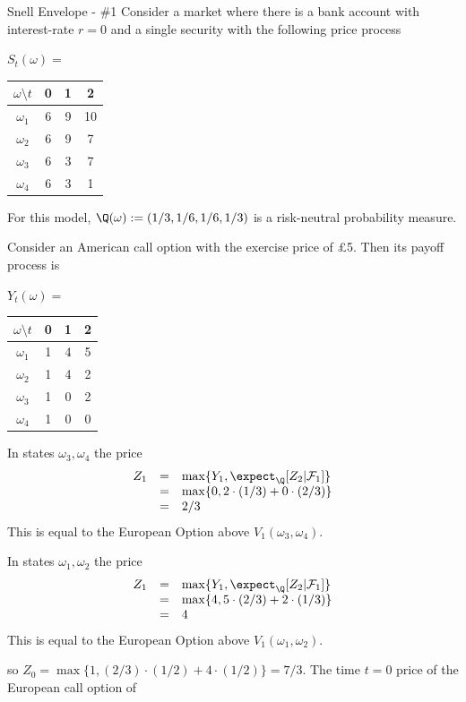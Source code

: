 \documentclass[11pt,a4paper]{article}
\begin{document}
  \begin{example}{Snell Envelope - \#1}\label{ex_snell_evelope_1}
    Consider a market where there is a bank account with interest-rate $r=0$ and a single security with the following price process
    \begin{center}
      $S_t(\omega)=$\begin{tabular}{c|ccc}
        $\omega\setminus t$&0&1&2\\\hline
        $\omega_1$&6&9&10\\
        $\omega_2$&6&9&7\\
        $\omega_3$&6&3&7\\
        $\omega_4$&6&3&1
      \end{tabular}
    \end{center}
    For this model, $\Q(\omega):=(1/3,1/6,1/6,1/3)$ is a risk-neutral probability measure.
    \par Consider an American call option with the exercise price of £5. Then its payoff process is
    \begin{center}
      $Y_t(\omega)=$\begin{tabular}{c|ccc}
        $\omega\setminus t$&0&1&2\\\hline
        $\omega_1$&1&4&5\\
        $\omega_2$&1&4&2\\
        $\omega_3$&1&0&2\\
        $\omega_4$&1&0&0
      \end{tabular}
    \end{center}
    In states $\omega_3,\omega_4$ the price
    \[\begin{array}{rcl}
      Z_1&=&\max\{Y_1,\expect_\Q[Z_2|\mathcal{F}_1]\}\\
      &=&\max\{0,2\cdot(1/3)+0\cdot(2/3)\}\\
      &=&2/3
    \end{array}\]
    This is equal to the European Option above $V_1(\omega_3,\omega_4)$.
    \par In states $\omega_1,\omega_2$ the price
    \[\begin{array}{rcl}
      Z_1&=&\max\{Y_1,\expect_\Q[Z_2|\mathcal{F}_1]\}\\
      &=&\max\{4,5\cdot(2/3)+2\cdot(1/3)\}\\
      &=&4
    \end{array}\]
    This is equal to the European Option above $V_1(\omega_1,\omega_2)$.
    \par so $Z_0=\max\{1,(2/3)\cdot(1/2)+4\cdot(1/2)\}=7/3$. The time $t=0$ price of the European call option of
  \end{example}
\end{document}
